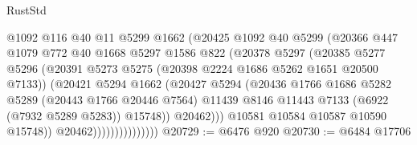 \begin{lexlean}{RustStd}
\begin{coremodule}
                                  @1092
                                  @116
                                  @40
                                  @11
                                  @5299
                                  @1662
                                  (@20425
                                    @1092
                                    @40
                                    @5299
                                    (@20366
                                      @447
                                      @1079
                                      @772
                                      @40
                                      @1668
                                      @5297
                                      @1586
                                      @822
                                      (@20378
                                        @5297
                                        (@20385
                                          @5277
                                          @5296
                                          (@20391
                                            @5273
                                            @5275
                                            (@20398 @2224 @1686 @5262 @1651 @20500 @7133))
                                          (@20421
                                            @5294
                                            @1662
                                            (@20427
                                              @5294
                                              (@20436
                                                @1766
                                                @1686
                                                @5282
                                                @5289
                                                (@20443 @1766 @20446 @7564)
                                                @11439
                                                @8146
                                                @11443
                                                @7133
                                                (@6922 (@7932 @5289 @5283))
                                                @15748))
                                            @20462)))
                                      @10581
                                      @10584
                                      @10587
                                      @10590
                                      @15748))
                                  @20462)))))))))))))))
@20729 := @6476 @920
@20730 := @6484 @17706

\end{coremodule}
\end{lexlean}
